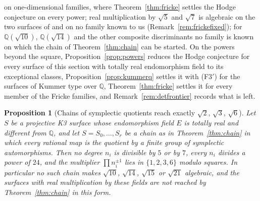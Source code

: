 \documentclass[11pt,reqno]{amsart}
\numberwithin{equation}{section}
\theoremstyle{plain}
\newtheorem{proposition}[theorem]{Proposition}
\theoremstyle{definition}
\newcommand{\QQ}{\mathbb{Q}}
\newcommand{\Fiii}{\texorpdfstring{\textup{(F3$'$)}}{(F3')}}
\begin{document}
on one-dimensional families, where Theorem~\ref{thm:fricke} settles the Hodge conjecture on every power; real multiplication by $\sqrt5$ and $\sqrt7$ is algebraic on the two surfaces of \cite{vGS25} and on no family known to us (Remark~\ref{rem:frickefixed}); for $\QQ(\sqrt{10})$, $\QQ(\sqrt{14})$ and the other composite discriminants no family is known on which the chain of Theorem~\ref{thm:chain} can be started. On the powers beyond the square, Proposition~\ref{prop:powers} reduces the Hodge conjecture for every surface of this section with totally real endomorphism field to its exceptional classes, Proposition~\ref{prop:kummerq} settles it with \Fiii{} for the surfaces of Kummer type over $\QQ$, Theorem~\ref{thm:fricke} settles it for every member of the Fricke families, and Remark~\ref{rem:detfrontier} records what is left.

\begin{proposition}[Chains of symplectic quotients reach exactly $\sqrt2$, $\sqrt3$, $\sqrt6$]\label{prop:sqrt10}
Let $S$ be a projective K3 surface whose endomorphism field $E$ is totally real and different from $\QQ$, and let $S=S_{0},\dots,S_{r}$ be a chain as in Theorem~\ref{thm:chain} in which every rational map is the quotient by a finite group of symplectic automorphisms. Then no degree $n_{i}$ is divisible by $5$ or by $7$, every $n_{i}$ divides a power of $24$, and the multiplier $\prod n_{i}^{\pm1}$ lies in $\{1,2,3,6\}$ modulo squares. In particular no such chain makes $\sqrt{10}$, $\sqrt{14}$, $\sqrt{15}$ or $\sqrt{21}$ algebraic, and the surfaces with real multiplication by these fields are not reached by Theorem~\ref{thm:chain} in this form.
\end{proposition}
\end{document}
